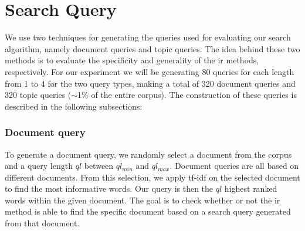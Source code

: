 \section{Search Query}\label{sec:query}

We use two techniques for generating the queries used for evaluating our search algorithm, namely document queries and topic queries.
The idea behind these two methods is to evaluate the specificity and generality of the \gls{ir} methods, respectively.
For our experiment we will be generating 80 queries for each length from 1 to 4 for the two query types, making a total of 320 document queries and 320 topic queries ($\sim$1$\%$ of the entire corpus).
The construction of these queries is described in the following subsections:

\subsubsection{Document query}\label{subsec:query_gen_doc}
To generate a document query, we randomly select a document from the corpus and a query length $ql$ between $ql_{min}$ and $ql_{max}$.
Document queries are all based on different documents.
From this selection, we apply \gls{tf-idf} on the selected document to find the most informative words.
Our query is then the $ql$ highest ranked words within the given document.
The goal is to check whether or not the \gls{ir} method is able to find the specific document based on a search query generated from that document.

